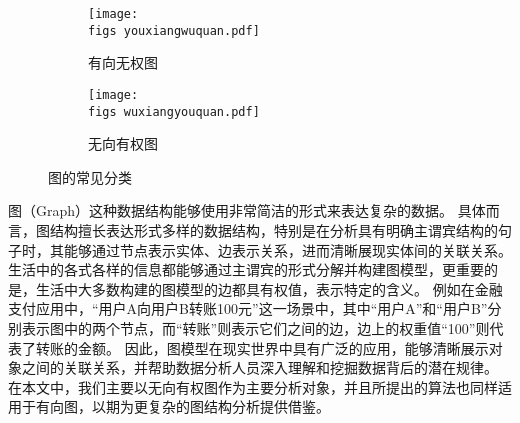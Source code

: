 \begin{figure}[h!]
    \def\wscorevone{0.48}
    \centering
        \begin{subfigure}[t]{\wscorevone\linewidth}
            \centering
            \resizebox{\linewidth}{!}
            {
                \texttt{[image: \\figs youxiangwuquan.pdf]}
            }
            \caption{有向无权图}
            \label{fig:example_noweight}
        \end{subfigure}
        \hfill
        \begin{subfigure}[t]{\wscorevone\linewidth}
            \centering
            \resizebox{\linewidth}{!}
            {
                \texttt{[image: \\figs wuxiangyouquan.pdf]}
            }
            \caption{无向有权图}
            \label{fig:example_weight}
        \end{subfigure}
        \label{fig:definition}
        \caption{图的常见分类}
    \end{figure}

图（Graph）这种数据结构能够使用非常简洁的形式来表达复杂的数据。
具体而言，图结构擅长表达形式多样的数据结构，特别是在分析具有明确主谓宾结构的句子时，其能够通过节点表示实体、边表示关系，进而清晰展现实体间的关联关系。
生活中的各式各样的信息都能够通过主谓宾的形式分解并构建图模型，更重要的是，生活中大多数构建的图模型的边都具有权值，表示特定的含义。
例如在金融支付应用中，“用户A向用户B转账100元”这一场景中，其中“用户A”和“用户B”分别表示图中的两个节点，而“转账”则表示它们之间的边，边上的权重值“100”则代表了转账的金额。
因此，图模型在现实世界中具有广泛的应用，能够清晰展示对象之间的关联关系，并帮助数据分析人员深入理解和挖掘数据背后的潜在规律。
在本文中，我们主要以无向有权图作为主要分析对象，并且所提出的算法也同样适用于有向图，以期为更复杂的图结构分析提供借鉴。

